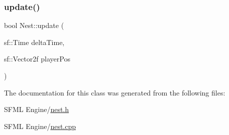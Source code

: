 \mbox{\label{class_nest_a90efe6e30a891f7dd0620d4f14c3cef6}} 
\subsubsection{\texorpdfstring{update()}{update()}}
{\footnotesize\ttfamily bool Nest\+::update (\begin{DoxyParamCaption}\item[{sf\+::\+Time}]{delta\+Time,  }\item[{sf\+::\+Vector2f}]{player\+Pos }\end{DoxyParamCaption})}



The documentation for this class was generated from the following files\+:\begin{DoxyCompactItemize}
\item 
S\+F\+M\+L Engine/\hyperlink{nest_8h}{nest.\+h}\item 
S\+F\+M\+L Engine/\hyperlink{nest_8cpp}{nest.\+cpp}\end{DoxyCompactItemize}
